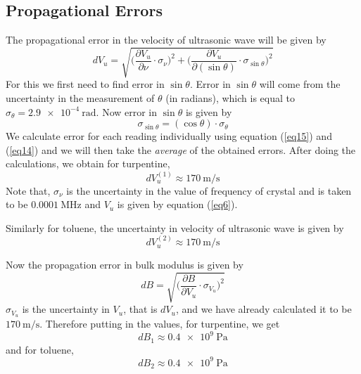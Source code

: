 \documentclass{article}
\begin{document}
\subsection{Propagational Errors}
The propagational error in the velocity of ultrasonic wave will be given by
\begin{equation}
\label{eq14}
    d V_u = \sqrt{\Bigg( \dfrac{\partial V_u}{\partial \nu} \cdot\sigma_{\nu}\Bigg)^2 + \Bigg( \dfrac{\partial V_u}{\partial (\sin \theta)} \cdot \sigma_{\sin \theta} \Bigg)^2} 
\end{equation}
For this we first need to find error in $\sin \theta$. Error in $\sin \theta$ will come from the uncertainty in the measurement of $\theta$ (in radians), which is equal to $\sigma_{\theta} = \SI{2.9e-4}{\radian}$. Now error in $\sin \theta$ is given by
\begin{equation}
\label{eq15}
    \sigma_{\sin \theta} = (\cos \theta) \cdot \sigma_{\theta}
\end{equation}
We calculate error for each reading individually using equation (\ref{eq15}) and (\ref{eq14}) and we will then take the \textit{average} of the obtained errors. After doing the calculations, we obtain for turpentine, 
\begin{equation}
    \boxed{d V_u^{(1)} \approx \SI{170}{\metre \per \second}}
\end{equation}
Note that, $\sigma_{\nu}$ is the uncertainty in the value of frequency of crystal and is taken to be $\SI{0.0001}{\mega \hertz}$ and $V_u$ is given by equation (\ref{eq6}).
\par
\noindent
Similarly for toluene, the uncertainty in velocity of ultrasonic wave is given by
\begin{equation}
    \boxed{d V_u^{(2)} \approx \SI{170}{\metre \per \second}}
\end{equation}
\par
\noindent
Now the propagation error in bulk modulus is given by
\begin{equation}
    d B = \sqrt{\Bigg(\dfrac{\partial B}{\partial V_u} \cdot \sigma_{V_u} \Bigg)^2}
\end{equation}
$\sigma_{V_u}$ is the uncertainty in $V_u$, that is $d V_u$, and we have already calculated it to be $\SI{170}{\metre \per \second}$. Therefore putting in the values, for turpentine, we get
\begin{equation}
    \boxed{d B_1 \approx \SI{0.4e9}{\pascal}}
\end{equation}
and for toluene, 
\begin{equation}
    \boxed{d B_2 \approx \SI{0.4e9}{\pascal}}
\end{equation}
\end{document}
